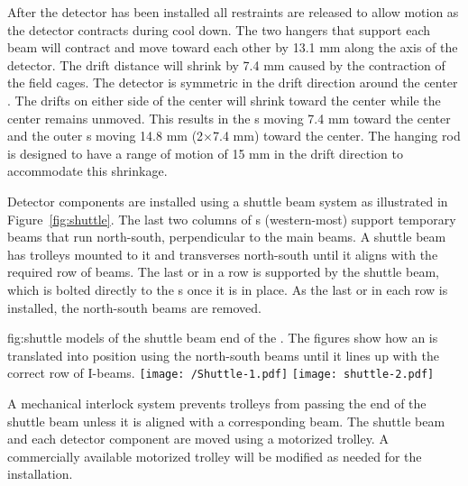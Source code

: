 After the detector has been installed all restraints are released to allow motion as the detector contracts during cool down.  The two hangers that support each  beam will contract and move toward each other by 13.1 mm along the axis of the detector.  
The drift distance will shrink by 7.4 mm caused by the contraction of the field cages.  The detector is symmetric in the drift direction around the center .  The drifts on either side of the center  will  shrink toward the center while the center  remains unmoved.  This results in the s moving 7.4 mm toward the center and the outer s moving 14.8 mm (2$\times$7.4 mm) toward the center.  The hanging rod is designed to have a range of motion of 15 mm in the drift direction to accommodate this shrinkage.




Detector components are installed using a shuttle beam system as
illustrated in Figure~\ref{fig:shuttle}.  
The last two columns of
\fdth{}s (western-most) support temporary beams that run
north-south, perpendicular to the main  beams.  
A shuttle beam has trolleys mounted to it and transverses 
north-south until it aligns with the required row of  beams.  
The last  or  in a row is supported by the shuttle beam, which is bolted directly to the \fdth{}s once it is in place.  
As the last  or  in each row is installed, the north-south beams are removed.

\begin{dunefigure}{fig:shuttle}
  {\threed models of the shuttle beam end of the . The figures show how an 
is translated into position using the north-south beams until it lines up with the correct
row of I-beams.}
\texttt{[image: /Shuttle-1.pdf]}
 \texttt{[image: shuttle-2.pdf]}
\end{dunefigure}

A mechanical interlock system  prevents trolleys
from passing the end of the shuttle beam unless it is aligned with a
corresponding  beam.  The shuttle beam and each detector component are
moved using a motorized trolley.  A commercially available motorized
trolley will be modified as needed for the
installation. 




